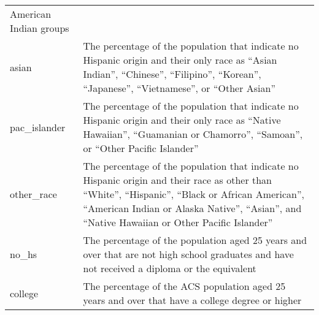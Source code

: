 \documentclass[12pt,twoside]{reedthesis}
\theoremstyle{definition}
\theoremstyle{definition}
\theoremstyle{definition}
\theoremstyle{remark}
\begin{document}
\begin{longtable}[]{@{}ll@{}}
\begin{minipage}[t]{0.50\columnwidth}
American Indian groups\strut
\end{minipage}\tabularnewline
\begin{minipage}[t]{0.44\columnwidth}\raggedright
asian\strut
\end{minipage} & \begin{minipage}[t]{0.50\columnwidth}\raggedright
The percentage of the population that indicate no Hispanic origin and
their only race as ``Asian Indian'', ``Chinese'', ``Filipino'',
``Korean'', ``Japanese'', ``Vietnamese'', or ``Other Asian''\strut
\end{minipage}\tabularnewline
\begin{minipage}[t]{0.44\columnwidth}\raggedright
pac\_islander\strut
\end{minipage} & \begin{minipage}[t]{0.50\columnwidth}\raggedright
The percentage of the population that indicate no Hispanic origin and
their only race as ``Native Hawaiian'', ``Guamanian or Chamorro'',
``Samoan'', or ``Other Pacific Islander''\strut
\end{minipage}\tabularnewline
\begin{minipage}[t]{0.44\columnwidth}\raggedright
other\_race\strut
\end{minipage} & \begin{minipage}[t]{0.50\columnwidth}\raggedright
The percentage of the population that indicate no Hispanic origin and
their race as other than ``White'', ``Hispanic'', ``Black or African
American'', ``American Indian or Alaska Native'', ``Asian'', and
``Native Hawaiian or Other Pacific Islander''\strut
\end{minipage}\tabularnewline
\begin{minipage}[t]{0.44\columnwidth}\raggedright
no\_hs\strut
\end{minipage} & \begin{minipage}[t]{0.50\columnwidth}\raggedright
The percentage of the population aged 25 years and over that are not
high school graduates and have not received a diploma or the
equivalent\strut
\end{minipage}\tabularnewline
\begin{minipage}[t]{0.44\columnwidth}\raggedright
college\strut
\end{minipage} & \begin{minipage}[t]{0.50\columnwidth}\raggedright
The percentage of the ACS population aged 25 years and over that have a
college degree or higher\strut
\end{minipage}\tabularnewline

\end{longtable}
\end{document}
